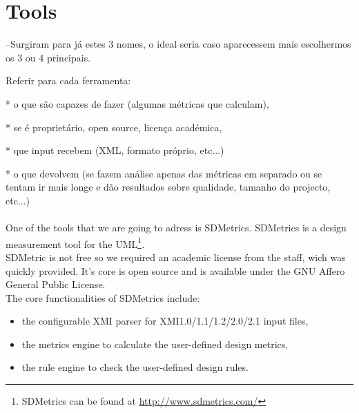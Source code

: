 \section{Tools}

--Surgiram para já estes 3 nomes, o ideal seria caso aparecessem mais escolhermos os 3 ou 4 principais.

Referir para cada ferramenta:

* o que são capazes de fazer (algumas métricas que calculam),

* se é proprietário, open source, licença académica,

* que input recebem (XML, formato próprio, etc...)

* o que devolvem (se fazem análise apenas das métricas em separado ou se tentam ir mais longe e dão resultados sobre qualidade, tamanho do projecto, etc...)\\
\\

One of the tools that we are going to adress is SDMetrics. SDMetrics is a design measurement tool for the UML\footnote{SDMetrics can be found at \url{http://www.sdmetrics.com/}}.\\
SDMetric is not free so we required an academic license from the staff, wich was quickly provided. It's core is open source and is available under the GNU Affero General Public License.\\
The core functionalities of SDMetrics include:
\begin{itemize}
\item the configurable XMI parser for XMI1.0/1.1/1.2/2.0/2.1 input files,
\item the metrics engine to calculate the user-defined design metrics,
\item the rule engine to check the user-defined design rules.
\end{itemize}
